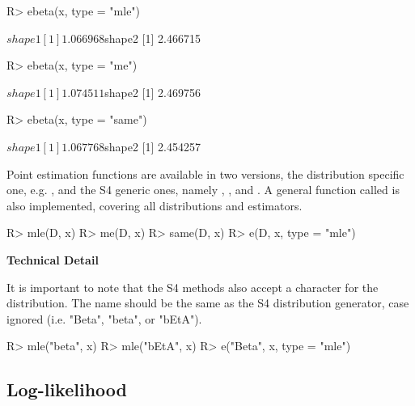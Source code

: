 \documentclass[nojss]{jss}
\newcommand{\fct}[1]{\code{#1()}}
\begin{document}
\begin{Schunk}
\begin{Sinput}
R> ebeta(x, type = "mle")
\end{Sinput}
\begin{Soutput}
$shape1
[1] 1.066968

$shape2
[1] 2.466715
\end{Soutput}
\begin{Sinput}
R> ebeta(x, type = "me")
\end{Sinput}
\begin{Soutput}
$shape1
[1] 1.074511

$shape2
[1] 2.469756
\end{Soutput}
\begin{Sinput}
R> ebeta(x, type = "same")
\end{Sinput}
\begin{Soutput}
$shape1
[1] 1.067768

$shape2
[1] 2.454257
\end{Soutput}
\end{Schunk}

Point estimation functions are available in two versions, the distribution specific one, e.g. \fct{ebeta}, and the S4 generic ones, namely \fct{mle}, \fct{me}, and \fct{same}. A general function called \fct{e} is also implemented, covering all distributions and estimators.

\begin{CodeChunk}
\begin{CodeInput}
R> mle(D, x)
R> me(D, x)
R> same(D, x)
R> e(D, x, type = "mle")
\end{CodeInput}
\end{CodeChunk}

\begin{leftbar}
\textbf{Technical Detail}

It is important to note that the S4 methods also accept a character for the distribution. The name should be the same as the S4 distribution generator, case ignored (i.e. "Beta", "beta", or "bEtA").

\begin{CodeChunk}
\begin{CodeInput}
R> mle("beta", x)
R> mle("bEtA", x)
R> e("Beta", x, type = "mle")
\end{CodeInput}
\end{CodeChunk}

\end{leftbar}

\subsection[Log-likelihood]{Log-likelihood}\label{ss:ll}
\end{document}
